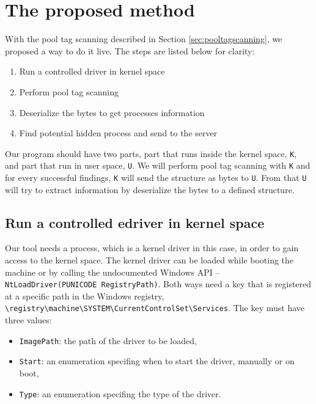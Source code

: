 \chapter[The proposed method]{The proposed method}

With the pool tag scanning described in Section \ref{sec:pooltagscanning}, we proposed a way to do it live. The steps are listed below for clarity:

\begin{enumerate}[label={Step \arabic*. },leftmargin=4\parindent]
  \item Run a controlled driver in kernel space
  \item Perform pool tag scanning
  \item Deserialize the bytes to get processes information
  \item Find potential hidden process and send to the server
\end{enumerate}

Our program should have two parts, part that runs inside the kernel space, \texttt{K}, and part that run in user space, \texttt{U}. We will perform pool tag scanning with \texttt{K} and for every successful findings, \texttt{K} will send the structure as bytes to \texttt{U}. From that \texttt{U} will try to extract information by deserialize the bytes to a defined structure.

\section[Run a controlled driver in kernel space]{Run a controlled edriver in kernel space}

Our tool needs a process, which is a kernel driver in this case, in order to gain access to the kernel space. The kernel driver can be loaded while booting the machine or by calling the undocumented Windows API -- \texttt{NtLoadDriver(PUNICODE RegistryPath)}. Both ways need a key that is registered at a specific path in the Windows registry, \texttt{\textbackslash registry\textbackslash machine\textbackslash SYSTEM\textbackslash CurrentControlSet\textbackslash Services}. The key must have three values:

\begin{itemize}
  \item \texttt{ImagePath}: the path of the driver to be loaded,
  \item \texttt{Start}: an enumeration specifing when to start the driver, manually or on boot,
  \item \texttt{Type}: an enumeration specifing the type of the driver.
\end{itemize}

